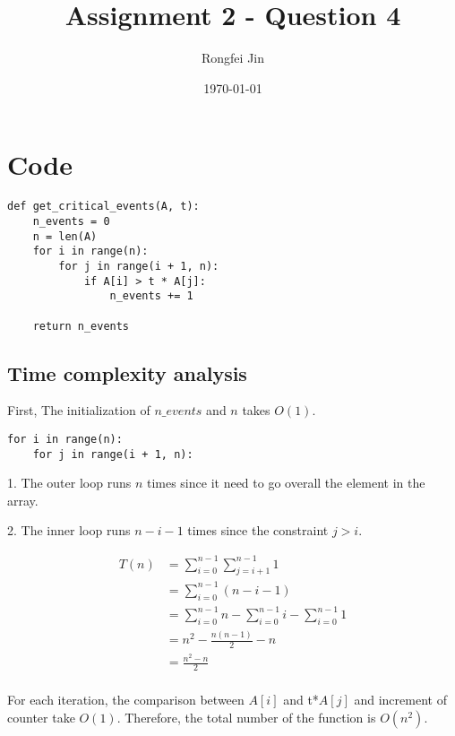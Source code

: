 \documentclass{article}
\author{Rongfei Jin}
\title{Assignment 2 - Question 4}
\date{\today}
\begin{document}
\section{Code}

\begin{lstlisting}
def get_critical_events(A, t):
    n_events = 0
    n = len(A)
    for i in range(n):
        for j in range(i + 1, n):
            if A[i] > t * A[j]:
                n_events += 1

    return n_events
\end{lstlisting}

\subsection{Time complexity analysis}

First, The initialization of $n\_events$ and $n$ takes $O(1)$.

\begin{lstlisting}
for i in range(n):
    for j in range(i + 1, n):
\end{lstlisting}

1. The outer loop runs $n$ times since it need to go overall the element in the array.

2. The inner loop runs $n - i - 1$ times since the constraint $j > i$.

\begin{align*}
    T(n) &= \sum_{i=0}^{n-1} \sum_{j=i+1}^{n-1} 1 \\
    &= \sum_{i=0}^{n-1} (n - i - 1) \\
    &= \sum_{i=0}^{n-1} n - \sum_{i=0}^{n-1} i - \sum_{i=0}^{n-1} 1 \\
    &= n^2 - \frac{n(n-1)}{2} - n \\
    &= \frac{n^2 - n}{2} \\
\end{align*}

For each iteration, the comparison between $A[i]$ and t*$A[j]$ and increment of counter take $O(1)$.
Therefore, the total number of the function is $O(n^2)$.
\end{document}
